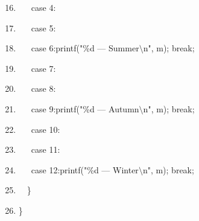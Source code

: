 \begin{frame}
	\begin{enumerate}
		\setcounter{enumi}{15}
		\item {~~~case 4:}
		\item {~~~case 5:}
		\item {~~~case 6:printf("\%d --- Summer$\setminus$n", m); break;}
		\item {~~~case 7:}
		\item {~~~case 8:}
		\item {~~~case 9:printf("\%d --- Autumn$\setminus$n", m); break;}
		\item {~~~case 10:}
		\item {~~~case 11:}
		\item {~~~case 12:printf("\%d --- Winter$\setminus$n", m); break;}
		\item {~~\}}
		\item {\}}
	\end{enumerate}
\end{frame}
\fi